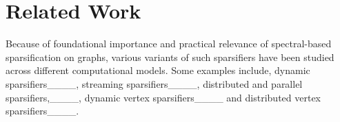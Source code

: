 \section{Related Work}
Because of foundational importance and practical relevance of spectral-based sparsification on graphs, various variants of such sparsifiers have been studied across different computational models. Some examples include, dynamic sparsifiers____, streaming sparsifiers____, distributed and parallel sparsifiers,____, dynamic vertex sparsifiers____ and distributed vertex sparsifiers____.